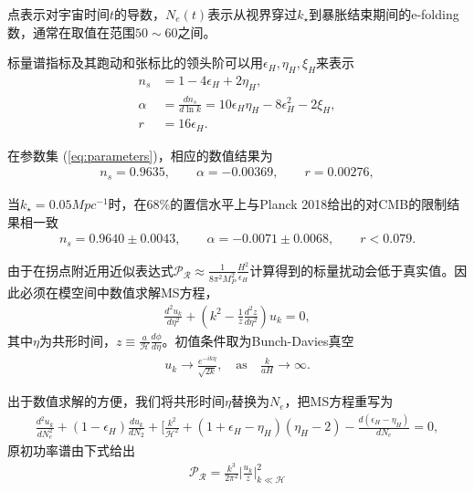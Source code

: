 点$\dot{}$表示对宇宙时间$t$的导数，$N_e(t)$表示从视界穿过$k_{\star}$到暴胀结束期间的e-folding数，通常在取值在范围$50\sim60$之间。

标量谱指标及其跑动和张标比的领头阶可以用$\epsilon_H,\eta_H,\xi_H$来表示
\begin{align}
    n_s &= 1- 4\epsilon_H+2\eta_H, \\
    \alpha &= \frac{dn_s}{d\ln k}=10\epsilon_H\eta_H-8\epsilon_H^2-2\xi_H, \\
    r &= 16\epsilon_H.
\end{align}

在参数集 (\ref{eq:parameters})，相应的数值结果为
\begin{align}
    n_s = 0.9635,\qquad \alpha=-0.00369,\qquad r=0.00276,
\end{align}

当$k_{\star}=0.05Mpc^{-1}$时，在$68\%$的置信水平上与Planck
2018给出的对CMB的限制结果相一致\citep{akrami2018planck}
\begin{align}
    n_s = 0.9640\pm 0.0043,\qquad 
    \alpha = -0.0071\pm 0.0068,\qquad
    r < 0.079.
\end{align}

由于在拐点附近用近似表达式$\mathcal{P_R}\approx\frac{1}{8\pi^2M^2_P}\frac{H^2}{\epsilon_H}$计算得到的标量扰动会低于真实值\citep{gao2018primordial}。因此必须在模空间中数值求解MS方程，
\begin{align}\label{eq:ms}
    \frac{d^2u_k}{d\eta^2}+\left(k^2-\frac{1}{z}\frac{d^2z}{d\eta^2}\right)u_k=0,
\end{align}
其中$\eta$为共形时间，$z\equiv\frac{a}{\mathcal{H}}\frac{d\phi}{d\eta}$。初值条件取为Bunch-Davies真空\citep{bunch1978quantum}
\begin{align}
    u_k\rightarrow\frac{e^{-ik\eta}}{\sqrt{2k}},\quad\text{as}\quad
    \frac{k}{aH}\rightarrow\infty.
\end{align}

出于数值求解的方便，我们将共形时间$\eta$替换为$N_e$，把MS方程重写为\citep{ballesteros2018primordial}
\begin{align}
    \frac{d^2u_k}{dN^2_e}+\left(1-\epsilon_H\right)\frac{du_k}{dN_2}+
    \lbrack\frac{k^2}{\mathcal{H}^2}+\left(1+\epsilon_H-\eta_H\right)\left(\eta_H-2\right)-\frac{d\left(\epsilon_H-\eta_H\right)}{dN_e}=0,
\end{align}
原初功率谱由下式给出
\begin{align}
    \mathcal{P_R}=\frac{k^3}{2\pi^2}\lvert\frac{u_k}{z}\rvert^2_{k\ll
    \mathcal{H}}
\end{align}

